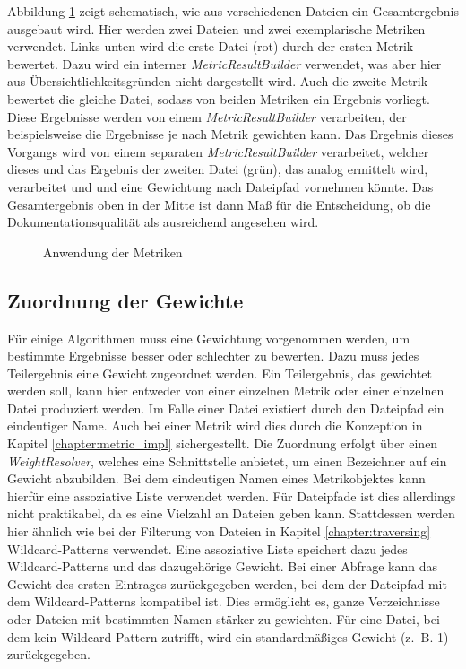Abbildung \ref{fig:metrics_apply} zeigt schematisch, wie aus verschiedenen Dateien ein Gesamtergebnis ausgebaut wird. Hier werden zwei Dateien und zwei exemplarische Metriken verwendet. Links unten wird die erste Datei (rot) durch der ersten Metrik bewertet. Dazu wird ein interner \textit{MetricResultBuilder} verwendet, was aber hier aus Übersichtlichkeitsgründen nicht dargestellt wird. Auch die zweite Metrik bewertet die gleiche Datei, sodass von beiden Metriken ein Ergebnis vorliegt. Diese Ergebnisse werden von einem \textit{MetricResultBuilder} verarbeiten, der beispielsweise die Ergebnisse je nach Metrik gewichten kann. Das Ergebnis dieses Vorgangs wird von einem separaten \textit{MetricResultBuilder} verarbeitet, welcher dieses und das Ergebnis der zweiten Datei (grün), das analog ermittelt wird, verarbeitet und und eine Gewichtung nach Dateipfad vornehmen könnte. Das Gesamtergebnis oben in der Mitte ist dann Maß für die Entscheidung, ob die Dokumentationsqualität als ausreichend angesehen wird. 
\begin{figure}[ht!]
\fontsize{7}{10}\selectfont
    \centering

    \caption{Anwendung der Metriken}
    \label{fig:metrics_apply}
\end{figure}
 
\subsection{Zuordnung der Gewichte}\label{chapter_weights_assign}
Für einige Algorithmen muss eine Gewichtung vorgenommen werden, um bestimmte Ergebnisse besser oder schlechter zu bewerten. Dazu muss jedes Teilergebnis eine Gewicht zugeordnet werden. Ein Teilergebnis, das gewichtet werden soll, kann hier entweder von einer einzelnen Metrik oder einer einzelnen Datei produziert werden. Im Falle einer Datei existiert durch den Dateipfad ein eindeutiger Name. Auch bei einer Metrik wird dies durch die Konzeption in Kapitel \ref{chapter:metric_impl} sichergestellt. Die Zuordnung erfolgt über einen \textit{WeightResolver}, welches eine Schnittstelle anbietet, um einen Bezeichner auf ein Gewicht abzubilden. Bei dem eindeutigen Namen eines Metrikobjektes kann hierfür eine assoziative Liste verwendet werden. 
Für Dateipfade ist dies allerdings nicht praktikabel, da es eine Vielzahl an Dateien geben kann. Stattdessen werden hier ähnlich wie bei der Filterung von Dateien in Kapitel \ref{chapter:traversing} Wildcard-Patterns verwendet. Eine assoziative Liste speichert dazu jedes Wildcard-Patterns und das dazugehörige Gewicht. Bei einer Abfrage kann das Gewicht des ersten Eintrages zurückgegeben werden, bei dem der Dateipfad mit dem Wildcard-Patterns kompatibel ist. Dies ermöglicht es, ganze Verzeichnisse oder Dateien mit bestimmten Namen stärker zu gewichten. Für eine Datei, bei dem kein Wildcard-Pattern zutrifft, wird ein standardmäßiges Gewicht (z.~B. 1) zurückgegeben. 

